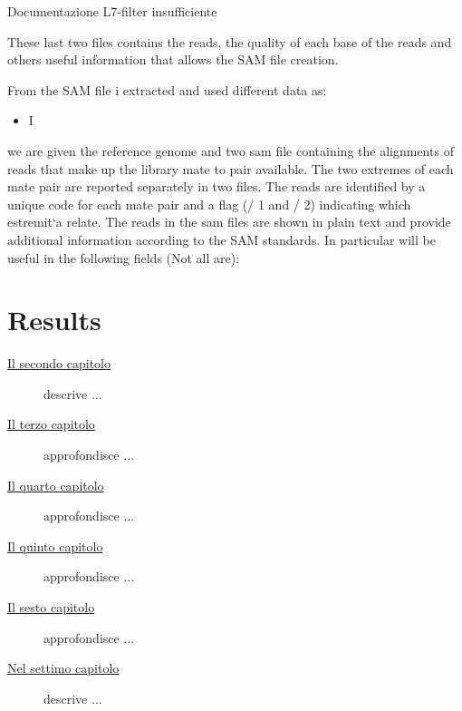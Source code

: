 \begin{risk}{Documentazione L7-filter insufficiente}
    \label{risk:documentation}
    \end{risk}

These last two files contains the reads, the quality of each base of the reads and others useful information that allows the SAM file creation.

From the SAM file i extracted and used different data as:
\begin{itemize}
\item I
\end{itemize}

we are given the reference genome and two sam file
containing the alignments of reads that make up the library mate to pair
available. The two extremes of each mate pair are reported separately in
two files. The reads are identified by a unique code for each mate pair and a
flag (/ 1 and / 2) indicating which estremit`a relate.
The reads in the sam files are shown in plain text and provide additional information according to the SAM standards. In particular will be useful in the following fields
(Not all are):

\section{Results}

\begin{description}
    \item[{\hyperref[cap:processi-metodologie]{Il secondo capitolo}}] descrive ...
    
    \item[{\hyperref[cap:descrizione-stage]{Il terzo capitolo}}] approfondisce ...
    
    \item[{\hyperref[cap:analisi-requisiti]{Il quarto capitolo}}] approfondisce ...
    
    \item[{\hyperref[cap:progettazione-codifica]{Il quinto capitolo}}] approfondisce ...
    
    \item[{\hyperref[cap:verifica-validazione]{Il sesto capitolo}}] approfondisce ...
    
    \item[{\hyperref[cap:conclusioni]{Nel settimo capitolo}}] descrive ...
\end{description}

